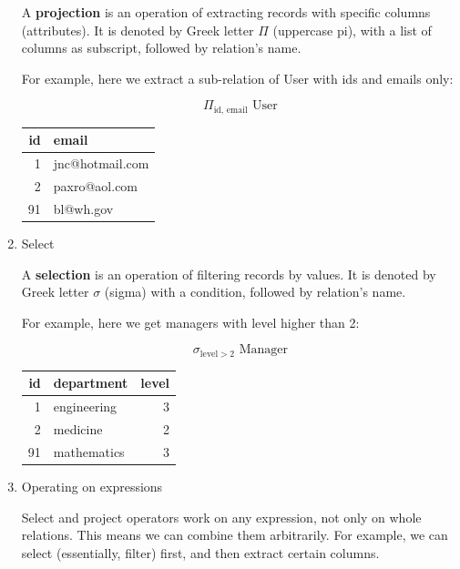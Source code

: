\documentclass[a4paper, justified, notitlepage, sfsidenotes, notoc]{tufte-book}
\begin{document}
\begin{enumerate}
A \textbf{\textbf{projection}} is an operation of extracting records with specific columns (attributes). It is denoted by Greek letter \(\Pi\) (uppercase pi), with a list of columns as subscript, followed by relation's name.

For example, here we extract a sub-relation of User with ids and emails only:

\begin{equation}
\Pi_{\textrm{id, email}} \textrm{ User}
\end{equation}

\begin{center}
\begin{tabular}{rl}
id & email\\
\hline
1 & jnc@hotmail.com\\
2 & paxro@aol.com\\
91 & bl@wh.gov\\
\end{tabular}
\end{center}

\item Select
\label{sec:orgde51a66}

A \textbf{\textbf{selection}} is an operation of filtering records by values. It is denoted by Greek letter \(\sigma\) (sigma) with a condition, followed by relation's name.

For example, here we get managers with level higher than 2:

\begin{equation}
\sigma_{\textrm{level} > 2} \textrm{ Manager}
\end{equation}

\begin{center}
\begin{tabular}{rlr}
id & department & level\\
\hline
1 & engineering & 3\\
2 & medicine & 2\\
91 & mathematics & 3\\
\end{tabular}
\end{center}

\item Operating on expressions
\label{sec:orgdcada5c}

Select and project operators work on any expression, not only on whole relations. This means we can combine them arbitrarily. For example, we can select (essentially, filter) first, and then extract certain columns.


\end{enumerate}
\end{document}
